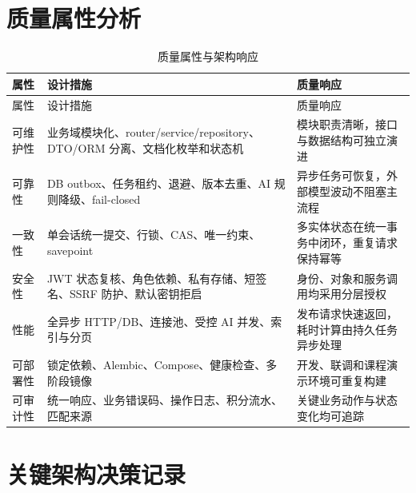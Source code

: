 \section{质量属性分析}

\begin{longtable}{L{2.4cm} L{6.1cm} L{6.1cm}}
  \caption{质量属性与架构响应}\label{tab:quality-attributes}\\
  \toprule
    属性 & 设计措施 & 质量响应 \\
  \midrule
  \endfirsthead
  \toprule
    属性 & 设计措施 & 质量响应 \\
  \midrule
  \endhead
  可维护性 & 业务域模块化、router/service/repository、DTO/ORM 分离、文档化枚举和状态机 & 模块职责清晰，接口与数据结构可独立演进 \\
  可靠性 & DB outbox、任务租约、退避、版本去重、AI 规则降级、fail-closed & 异步任务可恢复，外部模型波动不阻塞主流程 \\
  一致性 & 单会话统一提交、行锁、CAS、唯一约束、savepoint & 多实体状态在统一事务中闭环，重复请求保持幂等 \\
  安全性 & JWT 状态复核、角色依赖、私有存储、短签名、SSRF 防护、默认密钥拒启 & 身份、对象和服务调用均采用分层授权 \\
  性能 & 全异步 HTTP/DB、连接池、受控 AI 并发、索引与分页 & 发布请求快速返回，耗时计算由持久任务异步处理 \\
  可部署性 & 锁定依赖、Alembic、Compose、健康检查、多阶段镜像 & 开发、联调和课程演示环境可重复构建 \\
  可审计性 & 统一响应、业务错误码、操作日志、积分流水、匹配来源 & 关键业务动作与状态变化均可追踪 \\
  \bottomrule
\end{longtable}

\section{关键架构决策记录}

